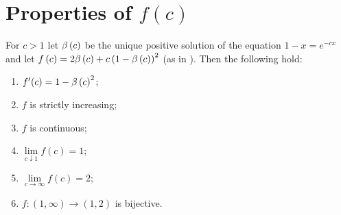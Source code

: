 \section{Properties of \texorpdfstring{$f(c)$}{f(c)}}\label{PPsec:propertiesF}
\begin{lem}\label{PPlem:function}
For $c>1$ let $\beta\left(c\right)$ be the unique positive solution of the equation $1-x=e^{-cx}$ and let $f\left(c\right)=2\beta\left(c\right)+c\left(1-\beta\left(c\right)\right)^2$ (as in ). Then the following hold:
\begin{enumerate}
\item\label{PPlem:functionA}
$f'(c)=1-\beta\left(c\right)^2$;
\item\label{PPlem:functionB}
$f$ is strictly increasing;
\item\label{PPlem:functionC}
$f$ is continuous;
\item\label{PPlem:functionD}
$\lim\limits_{c\downarrow 1}f(c)=1$;
\item\label{PPlem:functionE}
$\lim\limits_{c\to \infty}f(c)=2$;
\item\label{PPlem:functionF}
$f:\left(1,\infty\right)\to \left(1,2\right)$ is bijective.
\end{enumerate}
\end{lem}

